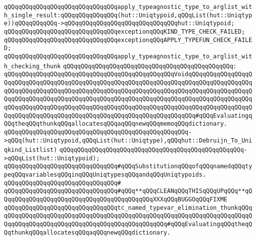 \verb|qQQqqQQqqQQqqQQqqQQqqQQqqQQqqQQqapply_typeagnostic_type_to_arglist_with_single_result:qQQqqQQqqQQqqQQq(hut::Uniqtypoid,qQQqList(hut::Uniqtype))qQQqqQQqqQQq->qQQqqQQqqQQqqQQqqQQqqQQqqQQqqQQqhut::Uniqtypoid;|\newline
\newline
\verb|qQQqqQQqqQQqqQQqqQQqqQQqqQQqqQQqexceptionqQQqKIND_TYPE_CHECK_FAILED;|\newline
\verb|qQQqqQQqqQQqqQQqqQQqqQQqqQQqqQQqexceptionqQQqAPPLY_TYPEFUN_CHECK_FAILED;|\newline
\newline
\verb|qQQqqQQqqQQqqQQqqQQqqQQqqQQqqQQqapply_typeagnostic_type_to_arglist_with_checking_thunk|\newline
\verb|qQQqqQQqqQQqqQQqqQQqqQQqqQQqqQQqqQQqqQQqqQQqqQQq:|\newline
\verb|qQQqqQQqqQQqqQQqqQQqqQQqqQQqqQQqqQQqqQQqqQQqqQQqVoidqQQqqQQqqQQqqQQqqQQqqQQqqQQqqQQqqQQqqQQqqQQqqQQqqQQqqQQqqQQqqQQqqQQqqQQqqQQqqQQqqQQqqQQqqQQqqQQqqQQqqQQqqQQqqQQqqQQqqQQqqQQqqQQqqQQqqQQqqQQqqQQqqQQqqQQqqQQqqQQqqQQqqQQqqQQqqQQqqQQqqQQqqQQqqQQqqQQqqQQqqQQqqQQqqQQqqQQqqQQqqQQqqQQqqQQqqQQqqQQqqQQqqQQqqQQqqQQqqQQqqQQqqQQqqQQqqQQqqQQqqQQqqQQqqQQqqQQqqQQqqQQqqQQqqQQqqQQqqQQqqQQqqQQqqQQqqQQqqQQqqQQqqQQqqQQq#qQQqEvaluatingqQQqtheqQQqthunkqQQqallocatesqQQqaqQQqnewqQQqmemoqQQqdictionary.|\newline
\verb|qQQqqQQqqQQqqQQqqQQqqQQqqQQqqQQqqQQqqQQqqQQqqQQqqQQq->qQQq(hut::Uniqtypoid,qQQqList(hut::Uniqtype),qQQqhut::Debruijn_To_Uniqkind_Listlist)|\newline
\verb|qQQqqQQqqQQqqQQqqQQqqQQqqQQqqQQqqQQqqQQqqQQqqQQqqQQq->qQQqList(hut::Uniqtypoid);|\newline
\newline
\newline
\newline
\verb|qQQqqQQqqQQqqQQqqQQqqQQqqQQqqQQq#qQQqSubstitutionqQQqofqQQqnamedqQQqtypeqQQqvariablesqQQqinqQQqUniqtypesqQQqandqQQqUniqtypoids.|\newline
\verb|qQQqqQQqqQQqqQQqqQQqqQQqqQQqqQQq#|\newline
\verb|qQQqqQQqqQQqqQQqqQQqqQQqqQQqqQQq#qQQq**qQQqCLEANqQQqTHISqQQqUPqQQq**qQQqqQQqqQQqqQQqqQQqqQQqqQQqqQQqqQQqqQQqqQQqXXXqQQqBUGGOqQQqFIXME|\newline
\newline
\verb|qQQqqQQqqQQqqQQqqQQqqQQqqQQqqQQqtc_named_typevar_elimination_thunkqQQqqQQqqQQqqQQqqQQqqQQqqQQqqQQqqQQqqQQqqQQqqQQqqQQqqQQqqQQqqQQqqQQqqQQqqQQqqQQqqQQqqQQqqQQqqQQqqQQqqQQqqQQqqQQqqQQqqQQq#qQQqEvaluatingqQQqtheqQQqthunkqQQqallocatesqQQqaqQQqnewqQQqdictionary.|\newline

